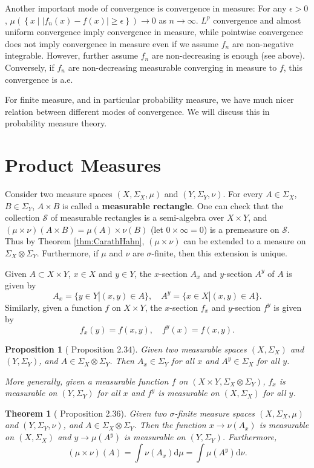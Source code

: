 \documentclass[openany]{book}
\newtheorem{proposition}{Proposition}[chapter]
\newtheorem{theorem}{Theorem}[chapter]
\theoremstyle{definition}
\theoremstyle{remark}
\begin{document}
Another important mode of convergence is convergence in measure: For any $\epsilon>0$, $\mu\left(\left\{x\middle||f_n(x)-f(x)|\ge\epsilon\right\}\right)\to0$ as $n\to\infty$. $L^p$ convergence and almost uniform convergence imply convergence in measure, while pointwise convergence does not imply convergence in measure even if we assume $f_n$ are non-negative integrable. However, further assume $f_n$ are non-decreasing is enough (see above). Conversely, if $f_n$ are non-decreasing measurable converging in measure to $f$, this convergence is a.e.

For finite measure, and in particular probability measure, we have much nicer relation between different modes of convergence. We will discuss this in probability measure theory.

\section{Product Measures}
Consider two measure spaces $(X,\Sigma_X,\mu)$ and $(Y,\Sigma_Y,\nu)$. For every $A\in\Sigma_X$, $B\in\Sigma_Y$, $A\times B$ is called a \textbf{measurable rectangle}. One can check that the collection $\mathcal{S}$ of measurable rectangles is a semi-algebra over $X\times Y$, and $(\mu\times\nu)(A\times B)=\mu(A)\times\nu(B)$ (let $0\times\infty=0$) is a premeasure on $\mathcal{S}$. Thus by Theorem \ref{thm:CarathHahn}, $(\mu\times\nu)$ can be extended to a measure on $\Sigma_X\otimes\Sigma_Y$. Furthermore, if $\mu$ and $\nu$ are $\sigma$-finite, then this extension is unique.

Given $A\subset X\times Y$, $x\in X$ and $y\in Y$, the $x$-section $A_x$ and $y$-section $A^y$ of $A$ is given by
\begin{equation*}
    A_x=\{y\in Y|(x,y)\in A\},\quad A^y=\{x\in X|(x,y)\in A\}.
\end{equation*}
Similarly, given a function $f$ on $X\times Y$, the $x$-section $f_x$ and $y$-section $f^y$ is given by
\begin{equation*}
    f_x(y)=f(x,y),\quad f^y(x)=f(x,y).
\end{equation*}
\begin{proposition}[\cite{F13} Proposition 2.34]
    Given two measurable spaces $(X,\Sigma_X)$ and $(Y,\Sigma_Y)$, and $A\in\Sigma_X\otimes\Sigma_Y$. Then $A_x\in\Sigma_Y$ for all $x$ and $A^y\in\Sigma_X$ for all $y$.

    More generally, given a measurable function $f$ on $(X\times Y,\Sigma_X\otimes\Sigma_Y)$, $f_x$ is measurable on $(Y,\Sigma_Y)$ for all $x$ and $f^y$ is measurable on $(X,\Sigma_X)$ for all $y$.
\end{proposition}
\begin{theorem}[\cite{F13} Proposition 2.36]
    Given two $\sigma$-finite measure spaces $(X,\Sigma_X,\mu)$ and $(Y,\Sigma_Y,\nu)$, and $A\in\Sigma_X\otimes\Sigma_Y$. Then the function $x\to\nu(A_x)$ is measurable on $(X,\Sigma_X)$ and $y\to\mu(A^y)$ is measurable on $(Y,\Sigma_Y)$. Furthermore,
    \begin{equation*}
        (\mu\times\nu)(A)=\int\nu(A_x)\mathrm{d}\mu=\int\mu(A^y)\mathrm{d}\nu.
    \end{equation*}
\end{theorem}
\end{document}
